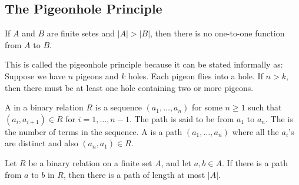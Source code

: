 \subsection{The Pigeonhole Principle}

\begin{thm}
If $A$ and $B$ are finite setes and $|A| > |B|$, then there is no one-to-one function from $A$ to $B$.
\end{thm}

\begin{discussion}
This is called the pigeonhole principle because it can be stated informally  as: Suppose we have $n$ pigeons and $k$ holes. Each pigeon flies into a hole. If $n > k$, then there must be at least one hole containing two or more pigeons.
\end{discussion}

\begin{defn}
A  in a binary relation $R$ is a sequence $(a_1, \ldots, a_n)$ for some $n \geq 1$ such that $(a_i, a_{i+1}) \in R$ for $i = 1,\ldots,n-1$. The path is said to be from $a_1$ to $a_n$. The  is the number of terms in the sequence. A  is a path $(a_1, \ldots, a_n)$ where all the $a_i$'s are distinct and also $(a_n, a_1) \in R$.
\end{defn}

\begin{stmt}
Let $R$ be a binary relation on a finite set $A$, and let $a, b \in A$. If there is a path from $a$ to $b$ in $R$, then there is a path of length at most $|A|$.
\end{stmt}

